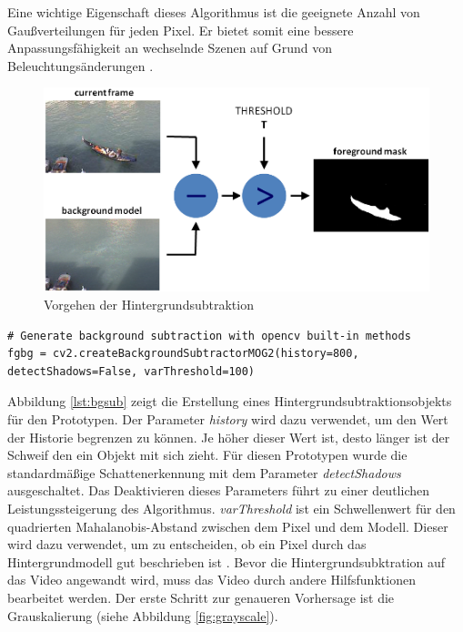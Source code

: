 \newpage

Eine wichtige Eigenschaft dieses Algorithmus ist die geeignete Anzahl von Gaußverteilungen für jeden Pixel. Er bietet somit eine bessere Anpassungsfähigkeit an wechselnde Szenen auf Grund von Beleuchtungsänderungen \cite{opencv_bg_subtraction2}. 

\begin{figure}[htb]
	\centering
	\includegraphics[width=.9\textwidth]{images/background_subtraction}
	\caption[Vorgehen der Hintergrundsubtraktion]{Vorgehen der Hintergrundsubtraktion \cite{opencv_bg_subtraction}}
\end{figure}

\vspace*{10mm}
\begin{lstlisting}[caption={Generation der Hintergrundsubtraktion}, label={lst:bgsub}]
# Generate background subtraction with opencv built-in methods    
fgbg = cv2.createBackgroundSubtractorMOG2(history=800, detectShadows=False, varThreshold=100)
\end{lstlisting}

Abbildung \ref{lst:bgsub} zeigt die Erstellung eines Hintergrundsubtraktionsobjekts für den Prototypen. Der Parameter \emph{history} wird dazu verwendet, um den Wert der Historie begrenzen zu können. Je höher dieser Wert ist, desto länger ist der Schweif den ein Objekt mit sich zieht. Für diesen Prototypen wurde die standardmäßige Schattenerkennung mit dem Parameter \emph{detectShadows} ausgeschaltet. Das Deaktivieren dieses Parameters führt zu einer deutlichen Leistungssteigerung des Algorithmus. \emph{varThreshold} ist ein Schwellenwert für den quadrierten Mahalanobis-Abstand zwischen dem Pixel und dem Modell. Dieser wird dazu verwendet, um zu entscheiden, ob ein Pixel durch das Hintergrundmodell gut beschrieben ist \cite{opencv_bg_subtraction3}. Bevor die Hintergrundsubktration auf das Video angewandt wird, muss das Video durch andere Hilfsfunktionen bearbeitet werden. Der erste Schritt zur genaueren Vorhersage ist die Grauskalierung \cite{cv_opencv} (siehe Abbildung \ref{fig:grayscale}).  

